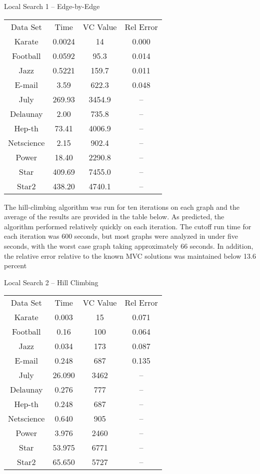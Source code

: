 \documentclass{sig-alternate-05-2015}
\begin{document}
\begin{center}
Local Search 1 -- Edge-by-Edge
\begin{tabular}{c c c c}
Data Set & Time & VC Value & Rel Error \\
Karate & 0.0024 & 14 & 0.000 \\
Football & 0.0592 & 95.3 & 0.014 \\
Jazz & 0.5221 & 159.7 & 0.011 \\
E-mail & 3.59 & 622.3 & 0.048 \\
July & 269.93 & 3454.9 & -- \\
Delaunay & 2.00 & 735.8 & -- \\
Hep-th & 73.41 & 4006.9 & -- \\
Netscience & 2.15 & 902.4 & -- \\
Power & 18.40 & 2290.8 & -- \\
Star & 409.69 & 7455.0 & -- \\
Star2 & 438.20 & 4740.1 & --
\end{tabular}
\end{center}

The hill-climbing algorithm was run for ten iterations on each graph and the average of the results are provided in the table below. As predicted, the algorithm performed relatively quickly on each iteration.  The cutoff run time for each iteration was 600 seconds, but most graphs were analyzed in under five seconds, with the worst case graph taking approximately 66 seconds.  In addition, the relative error relative to the known MVC solutions was maintained below 13.6 percent

\begin{center}
Local Search 2 -- Hill Climbing
\begin{tabular}{c c c c}
Data Set & Time & VC Value & Rel Error \\
Karate & 0.003 & 15 & 0.071 \\
Football & 0.16 & 100 & 0.064 \\
Jazz & 0.034 & 173 & 0.087 \\
E-mail & 0.248 & 687 & 0.135 \\
July & 26.090 & 3462 & -- \\
Delaunay & 0.276 & 777 & -- \\
Hep-th & 0.248 & 687 & -- \\
Netscience & 0.640 & 905 & -- \\
Power & 3.976 & 2460 & -- \\
Star & 53.975 & 6771 & -- \\
Star2 & 65.650 & 5727 & --
\end{tabular}
\end{center}
\end{document}
